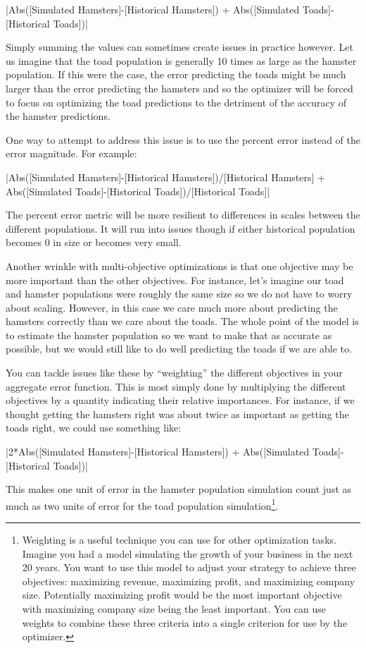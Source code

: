 \documentclass[]{memoir}
\newcommand{\DecValTok}[1]{\textcolor[rgb]{0.25,0.63,0.44}{{#1}}}
\newcommand{\FunctionTok}[1]{\textcolor[rgb]{0.02,0.16,0.49}{{#1}}}
\newcommand{\NormalTok}[1]{{#1}}
\begin{document}
|\FunctionTok{Abs}\NormalTok{([Simulated Hamsters]-[Historical Hamsters]) + }\FunctionTok{Abs}\NormalTok{([Simulated Toads]-[Historical Toads])}|

Simply summing the values can sometimes create issues in practice
however. Let us imagine that the toad population is generally 10 times
as large as the hamster population. If this were the case, the error
predicting the toads might be much larger than the error predicting the
hamsters and so the optimizer will be forced to focus on optimizing the
toad predictions to the detriment of the accuracy of the hamster
predictions.

One way to attempt to address this issue is to use the percent error
instead of the error magnitude. For example:

|\FunctionTok{Abs}\NormalTok{([Simulated Hamsters]-[Historical Hamsters])/[Historical Hamsters] + }\FunctionTok{Abs}\NormalTok{([Simulated Toads]-[Historical Toads])/[Historical Toads]}|

The percent error metric will be more resilient to differences in scales
between the different populations. It will run into issues though if
either historical population becomes 0 in size or becomes very small.

Another wrinkle with multi-objective optimizations is that one objective
may be more important than the other objectives. For instance, let's
imagine our toad and hamster populations were roughly the same size so
we do not have to worry about scaling. However, in this case we care
much more about predicting the hamsters correctly than we care about the
toads. The whole point of the model is to estimate the hamster
population so we want to make that as accurate as possible, but we would
still like to do well predicting the toads if we are able to.

You can tackle issues like these by ``weighting'' the different
objectives in your aggregate error function. This is most simply done by
multiplying the different objectives by a quantity indicating their
relative importances. For instance, if we thought getting the hamsters
right was about twice as important as getting the toads right, we could
use something like:

|\DecValTok{2}\NormalTok{*}\FunctionTok{Abs}\NormalTok{([Simulated Hamsters]-[Historical Hamsters]) + }\FunctionTok{Abs}\NormalTok{([Simulated Toads]-[Historical Toads])}|

This makes one unit of error in the hamster population simulation count
just as much as two units of error for the toad population
simulation\footnote{Weighting is a useful technique you can use for
  other optimization tasks. Imagine you had a model simulating the
  growth of your business in the next 20 years. You want to use this
  model to adjust your strategy to achieve three objectives: maximizing
  revenue, maximizing profit, and maximizing company size. Potentially
  maximizing profit would be the most important objective with
  maximizing company size being the least important. You can use weights
  to combine these three criteria into a single criterion for use by the
  optimizer.}.
\end{document}
